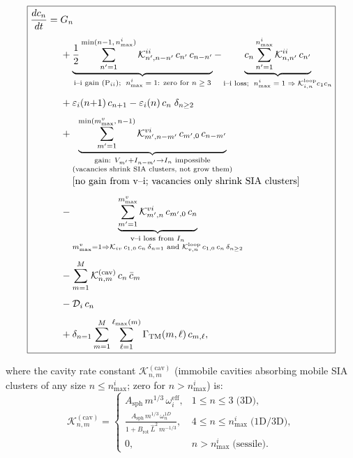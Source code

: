 \begin{equation}\label{eq:ME_SIA}
\boxed{
\begin{split}
\frac{dc_n}{dt} = {} &
  G_n
  \\[4pt]
  &+ \underbrace{
     \frac{1}{2}\sum_{n'=1}^{\min(n-1,\,n_{\max}^i)}
     \mathcal{K}_{n',n-n'}^{ii}\,c_{n'}\,c_{n-n'}
     }_{\text{i--i gain (P$_{ii}$);\; $n_{\max}^i=1$: zero for $n \geq 3$}}
   - \underbrace{
     c_n\sum_{n'=1}^{n_{\max}^i}
     \mathcal{K}_{n,n'}^{ii}\,c_{n'}
     }_{\text{i--i loss;\; $n_{\max}^i=1 \Rightarrow \mathcal{K}_{i,n}^{\mathrm{loop}}c_1 c_n$}}
  \\[4pt]
  &+ \varepsilon_i(n{+}1)\,c_{n+1}
   - \varepsilon_i(n)\,c_n\;\delta_{n \geq 2}
  \\[4pt]
  &+ \underbrace{
     \sum_{m'=1}^{\min(m_{\max}^v,\,n-1)}
     \mathcal{K}_{m',n-m'}^{vi}\,c_{m',0}\,c_{n-m'}
     }_{\substack{\text{gain: }V_{m'}+I_{n-m'}\to I_n \text{ impossible}\\
                  \text{(vacancies shrink SIA clusters, not grow them)}}}
  \\[-2pt]
  &\hphantom{{}+{}}
   \text{[no gain from v--i; vacancies only shrink SIA clusters]}
  \\[4pt]
  &- \underbrace{
     \sum_{m'=1}^{m_{\max}^v}
     \mathcal{K}_{m',n}^{vi}\,c_{m',0}\,c_n
     }_{\substack{\text{v--i loss from }I_n\\
                  m_{\max}^v=1 \Rightarrow \mathcal{K}_{iv}\,c_{1,0}\,c_n\,\delta_{n=1}
                  \text{ and }\mathcal{K}_{v,n}^{\mathrm{loop}}\,c_{1,0}\,c_n\,\delta_{n\geq 2}}}
  \\[4pt]
  &- \sum_{m=1}^{M}
     \mathcal{K}_{n,m}^{(\mathrm{cav})}\,c_n\,\bar{c}_m
  \\[4pt]
  &- \mathcal{D}_i\,c_n
  \\[4pt]
  &+ \delta_{n=1}\sum_{m=1}^{M}\sum_{\ell=1}^{\ell_{\max}(m)}
     \Gamma_{\mathrm{TM}}(m,\ell)\,c_{m,\ell},
\end{split}
}
\end{equation}

where the cavity rate constant $\mathcal{K}_{n,m}^{(\mathrm{cav})}$
(immobile cavities absorbing mobile SIA clusters of any size $n \leq
n_{\max}^i$; zero for $n > n_{\max}^i$) is:
\begin{equation}\label{eq:K_cav}
    \mathcal{K}_{n,m}^{(\mathrm{cav})} =
    \begin{cases}
        A_{\mathrm{sph}}\,m^{1/3}\,\omega_i^{\mathrm{eff}},
        & 1 \leq n \leq 3\;\text{(3D)}, \\[5pt]
        \displaystyle
        \frac{A_{\mathrm{sph}}\,m^{1/3}\,\omega_n^{1D}}
             {1 + B_{\mathrm{rot}}\,\hat{L}^2\,m^{-1/3}},
        & 4 \leq n \leq n_{\max}^i\;\text{(1D/3D)}, \\[5pt]
        0, & n > n_{\max}^i\;\text{(sessile)}.
    \end{cases}
\end{equation}

